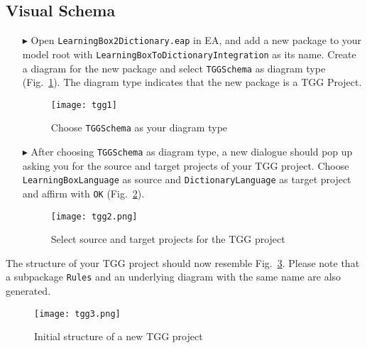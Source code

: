 \newpage
\subsection{Visual Schema}
\visHeader

\begin{enumerate}

\item[$\blacktriangleright$] Open \texttt{LearningBox2Dictionary.eap} in EA, and add a new package to your model root with \texttt{Learning\-Box\-To\-Dictionary\-Integration} as its name. 
Create a diagram for the new package and select \texttt{TGGSchema} as diagram type (Fig.~\ref{fig:tgg_diagram_type}). 
The diagram type indicates that the new package is a TGG Project. 

\begin{figure}[htbp]
\begin{center}
  \texttt{[image: tgg1]}
  \caption{Choose \texttt{TGGSchema} as your diagram type}  
  \label{fig:tgg_diagram_type}
\end{center}
\end{figure}

\item[$\blacktriangleright$] After choosing \texttt{TGGSchema} as diagram type, a new dialogue should pop up asking you for the source and target projects of your TGG project. 
Choose \texttt{Learning\-Box\-Language} as source and \texttt{Dictionary\-Language} as target project and affirm with \texttt{OK} (Fig.~\ref{fig:select_source_target}).

\begin{figure}[htbp]
\begin{center}
  \texttt{[image: tgg2.png]}
  \caption{Select source and target projects for the TGG project}  
  \label{fig:select_source_target}
\end{center}
\end{figure}
\end{enumerate}

The structure of your TGG project should now resemble Fig.~\ref{fig:new_tgg_project}.
Please note that a subpackage \texttt{Rules} and an underlying diagram with the same name are also generated.

\begin{figure}[htbp]
\begin{center}
  \texttt{[image: tgg3.png]}
  \caption{Initial structure of a new TGG project}  
  \label{fig:new_tgg_project}
\end{center}
\end{figure}


